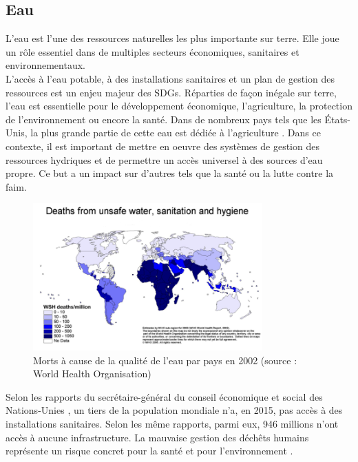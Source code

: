 \documentclass[10pt, article]{llncs}
\begin{document}
	\subsection{Eau}
			L'eau est l'une des ressources naturelles les plus importante sur terre. Elle joue un rôle essentiel dans de multiples secteurs économiques, sanitaires et environnementaux.\\
			L'accès à l'eau potable, à des installations sanitaires et un plan de gestion des ressources est un enjeu majeur des SDGs. Réparties de façon inégale sur terre, l'eau est essentielle pour le développement économique, l'agriculture, la protection de l'environnement ou encore la santé. Dans de nombreux pays tels que les États-Unis, la plus grande partie de cette eau est dédiée à l'agriculture \cite{world_business_council_for_sustainable_development_global_nodate}.
			Dans ce contexte, il est important de mettre en oeuvre des systèmes de gestion des ressources hydriques et de permettre un accès universel à des sources d'eau propre. Ce but a un impact sur d'autres tels que la santé ou la lutte contre la faim.
			\begin{figure}
				\begin{center}
					\includegraphics[width=250pt]{img/water_deaths_2002.png}
				\end{center}
				\caption{Morts à cause de la qualité de l'eau par pays en 2002 (source : World Health Organisation)}
			\end{figure}
			Selon les rapports du secrétaire-général du conseil économique et social des Nations-Unies \cite{united_nations_economic_and_social_council_progress_2017}\cite{united_nations_economic_and_social_council_progress_2017-1}, un tiers de la population mondiale n'a, en 2015, pas accès à des installations sanitaires. Selon les même rapports, parmi eux, 946 millions n'ont accès à aucune infrastructure. La mauvaise gestion des déchêts humains représente un risque concret pour la santé et pour l'environnement \cite{ashbolt_microbial_2004}.\\
\end{document}
